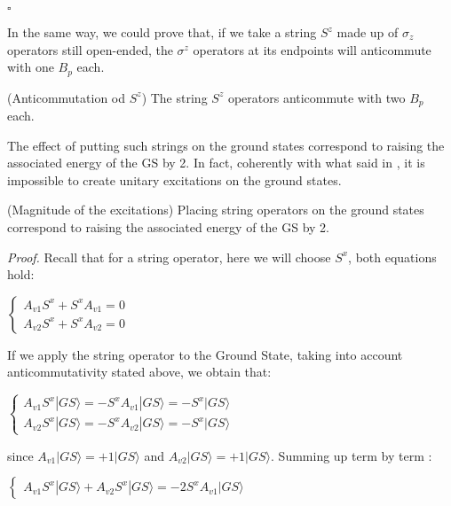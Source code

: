\documentclass{Configuration_Files/PoliMi3i_thesis}
\begin{document}
\hfill $\square$ 

In the same way, we could prove that, if we take a string $S^z$ made up of $\sigma_z$ operators still open-ended, the $\sigma^z$ operators at its endpoints will anticommute with one $B_p$ each.

\begin{proposition}(Anticommutation od $S^z$)
	The string $S^z$ operators anticommute with two $B_p$ each.
\end{proposition}

The effect of putting such strings on the ground states correspond to raising the associated energy of the GS by 2. In fact, coherently with what said in \textit{\cite{Her20}}, it is impossible to create unitary excitations on the ground states.

\begin{proposition}(Magnitude of the excitations)
	Placing string operators on the ground states correspond to raising the associated energy of the GS by 2.
\end{proposition}

\textit{Proof.} \newline
Recall that for a string operator, here we will choose $S^x$, both equations hold:

\begin{center}
	$\begin{cases} 
		A_{v1} S^x + S^x A_{v1} =0 \\
		A_{v2} S^x + S^x A_{v2} =0
	\end{cases}$ 
\end{center}

If we apply the string operator to the Ground State, taking into account anticommutativity stated above, we obtain that:

\begin{center}
	$\begin{cases}
		A_{v1} S^x |GS\rangle = - S^x A_{v1} |GS\rangle = - S^x |GS\rangle \\
		
		A_{v2} S^x |GS\rangle = - S^x A_{v2} |GS\rangle = - S^x |GS\rangle
	\end{cases}$ 
\end{center}

since $A_{v1}|GS\rangle = +1|GS\rangle$ and $A_{v2}|GS\rangle = +1|GS\rangle$.
Summing up term by term :

\begin{center}
	$\begin{cases}
		A_{v1} S^x |GS\rangle + A_{v2} S^x |GS\rangle = - 2 S^x A_{v1} |GS\rangle
	\end{cases}$ 
\end{center}
\end{document}
